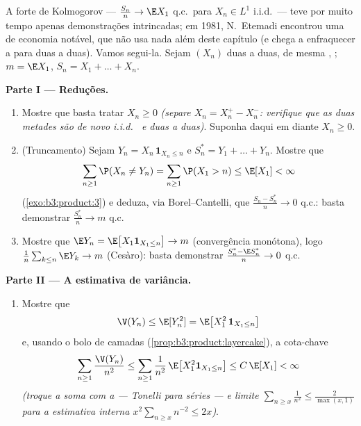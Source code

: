 \begin{problem}
\label{pb:b3:probability:1}
A  forte de Kolmogorov --- $\frac{S_n}n \to \E X_1$ q.c.\ para $X_n \in L^1$ i.i.d.\ --- teve
por muito tempo apenas demonstrações intrincadas; em 1981, N.~Etemadi
encontrou uma de economia notável, que não usa nada além deste capítulo
(e chega a enfraquecer a  para  duas a duas).
Vamos segui-la. Sejam $(X_n)$  duas a duas, de mesma
, ; $m = \E X_1$, $S_n = X_1 + \dots + X_n$.

\medskip
\noindent\textbf{Parte I --- Reduções.}
\begin{enumerate}
  \item Mostre que basta tratar $X_n \geq 0$ \emph{(separe $X_n = X_n^+ - X_n^-$: verifique que
        as duas metades são de novo i.i.d.\  e 
        duas a duas)}. Suponha daqui em diante $X_n \geq 0$.
  \item (Truncamento) Sejam $Y_n = X_n\,\mathbf 1_{X_n \leq n}$ e $S_n^* = Y_1 + \dots + Y_n$. Mostre que
        \[
        \sum_{n\geq1}\P(X_n \neq Y_n) =
        \sum_{n\geq1}\P(X_1 > n) \leq \E[X_1] < \infty
        \]
        (\cref{exo:b3:product:3}) e deduza, via Borel--Cantelli, que $\frac{S_n - S_n^*}{n} \to 0$ q.c.:
        basta demonstrar $\frac{S^*_n}n \to m$ q.c.
  \item Mostre que $\E Y_n = \E\bigl[X_1\mathbf 1_{X_1\leq
        n}\bigr] \to m$ (convergência monótona), logo $\frac1n\sum_{k\leq n}\E Y_k \to m$ (Cesàro):
        basta demonstrar $\frac{S_n^* - \E S_n^*}{n} \to 0$ q.c.
\end{enumerate}

\medskip
\noindent\textbf{Parte II --- A estimativa de variância.}
\begin{enumerate}[resume]
  \item Mostre que
        \[
        \V(Y_n) \leq \E[Y_n^2] = \E\bigl[X_1^2\,\mathbf
        1_{X_1 \leq n}\bigr]
        \]
        e, usando o bolo de camadas (\cref{prop:b3:product:layercake}), a cota-chave
        \[
        \sum_{n\geq1}\frac{\V(Y_n)}{n^2}
        \leq \sum_{n\geq1}\frac1{n^2}\,
        \E\bigl[X_1^2\mathbf 1_{X_1\leq n}\bigr]
        \leq C\,\E[X_1] < \infty
        \]
        \emph{(troque a soma com a  --- Tonelli para séries ---
        e limite $\sum_{n \geq
        x}\frac1{n^2} \leq \frac2{\max(x,1)}$ para a estimativa interna $x^2\sum_{n\geq x}n^{-2} \leq 2x$)}.
\end{enumerate}


\end{problem}
